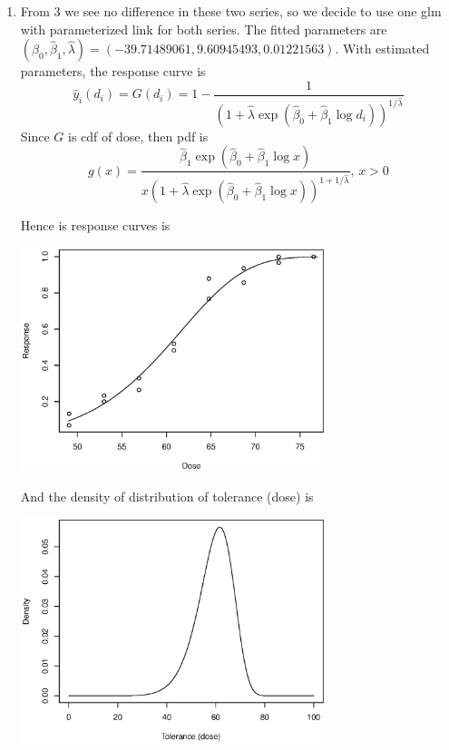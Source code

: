 \documentclass{article}
\begin{document}
\begin{enumerate}[leftmargin = 0 em, label = \arabic*., font = \bfseries]
      \item 
      From 3 we see no difference in these two series, so we decide to use one glm with parameterized link for both series. The fitted parameters are $(\hat{\beta}_0, \hat{\beta}_1, \hat{\lambda}) = (-39.71489061, 9.60945493, 0.01221563)$. With estimated parameters, the response curve is
      \[\hat{y}_i(d_i) = G(d_i) = 1 - \frac{1}{(1 + \hat{\lambda} \exp(\hat{\beta}_0 + \hat{\beta}_1 \log d_i))^{1/\hat{\lambda}}}\]
      Since $G$ is cdf of dose, then pdf is
      \[g(x) = \frac{\hat{\beta}_1 \exp(\hat{\beta}_0 + \hat{\beta}_1 \log x)}{x (1 + \hat{\lambda} \exp(\hat{\beta}_0 + \hat{\beta}_1 \log x))^{1 + 1/\hat{\lambda}}}, \, x > 0\]

      Hence is response curves is
      \begin{center}
      	\includegraphics[width = 0.7\textwidth]{response.eps}
      \end{center}

      And the density of distribution of tolerance (dose) is 
      \begin{center}
      	\includegraphics[width = 0.7\textwidth]{density.eps}
      \end{center}



\end{enumerate}
\end{document}

